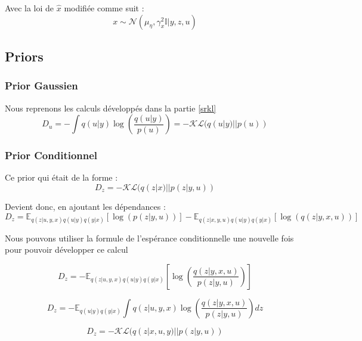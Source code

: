 \documentclass{article}
\begin{document}
Avec la loi de $\hat{x}$ modifiée comme suit :
\begin{equation*}
    x \sim \mathcal{N}(\mu_\eta, \gamma^2_x\mathbb{I} |y, z, u)
\end{equation*}

\subsection{Priors}

\subsubsection{Prior Gaussien}
Nous reprenons les calculs développés dans la partie \ref{srkl}
\begin{equation*}
    D_u = - \int q(u|y) \log\left(\frac{q(u|y)}{p(u)}\right) = - \mathcal{KL}(q(u|y)||p(u)) 
\end{equation*}

\subsubsection{Prior Conditionnel}
Ce prior qui était de la forme :
\begin{equation*}
    D_z = - \mathcal{KL}(q(z|x)||p(z|y,u))
\end{equation*}

Devient donc, en ajoutant les dépendances :
\begin{equation*}
    D_z = \mathbb{E}_{q(z|u,y,x)q(u|y)q(y|x)}\left[\log(p(z|y,u))\right] - \mathbb{E}_{q(z|x,y,u)q(u|y)q(y|x)}\left[\log(q(z|y,x,u))\right]
\end{equation*}

Nous pouvons utiliser la formule de l'espérance conditionnelle une nouvelle fois pour pouvoir développer ce calcul

\begin{equation*}
    D_z = - \mathbb{E}_{q(z|u,y,x)q(u|y)q(y|x)}\left[\log\left(\frac{q(z|y,x,u)}{p(z|y,u)}\right)\right]
\end{equation*}

\begin{equation*}
    D_z = - \mathbb{E}_{q(u|y)q(y|x)}\int q(z|u,y,x)\log\left(\frac{q(z|y,x,u)}{p(z|y,u)}\right) dz
\end{equation*}

\begin{equation}
    D_z = - \mathcal{KL}(q(z|x,u,y)||p(z|y,u))
\end{equation}
\end{document}
